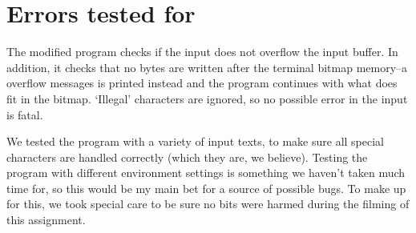 \documentclass[11pt]{article}
\begin{document}
\section{Errors tested for}

The modified program checks if the input does not overflow the input buffer. In addition, it checks that no bytes are written after the terminal bitmap memory--a overflow messages is printed instead and the program continues with what does fit in the bitmap. `Illegal' characters are ignored, so no possible error in the input is fatal.

We tested the program with a variety of input texts, to make sure all special characters are handled correctly (which they are, we believe). Testing the program with different environment settings is something we haven't taken much time for, so this would be my main bet for a source of possible bugs. To make up for this, we took special care to be sure no bits were harmed during the filming of this assignment.
\end{document}
